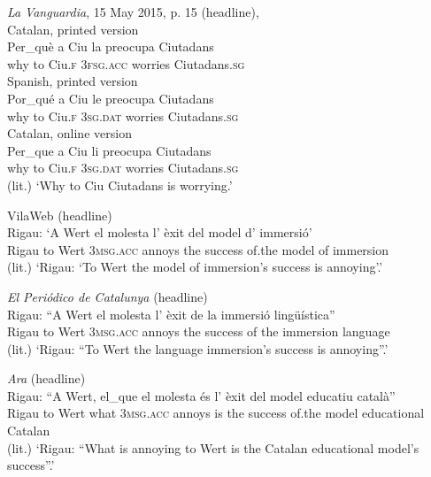 \documentclass[output=paper,colorlinks,citecolor=brown,modfonts,nonflat]{langsci/langscibook}
\begin{document}
\ea%
 \emph{La} \emph{Vanguardia}, 15 May 2015, p. 15 (headline),
 \label{ex:royo:5}\\
 \ea Catalan, printed version \label{ex:royo:5a}\\
 \gll Per\_què a Ciu la preocupa Ciutadans \\
why      to Ciu.\textsc{f} 3\textsc{fsg.acc} worries   Ciutadans.\textsc{sg} \\


 \ex Spanish, printed version \label{ex:royo:5b}\\
 \gll Por\_qué a Ciu le preocupa Ciutadans\\
why      to Ciu.\textsc{f} \textsc{3sg.dat} worries    Ciutadans.\textsc{sg}\\


\ex Catalan, online version \label{ex:royo:5c}\\
 \gll Per\_que a Ciu li preocupa Ciutadans \\
	why      to Ciu.\textsc{f} 3\textsc{sg.dat} worries    Ciutadans.\textsc{sg}\\
 \glt (lit.) ‘Why to Ciu Ciutadans is worrying.’

 \z
 \z


\ea%
 \label{ex:royo:6}
 \ea VilaWeb (headline)\\
 \gll Rigau: ‘A Wert el molesta l’ èxit del model d’ immersió’\\
Rigau   to Wert \textsc{3msg.acc} annoys   the success of.the model of immersion\\
 \glt (lit.) ‘Rigau: ‘To Wert the model of immersion’s success is annoying’.’

 \ex \textit{El Periódico de Catalunya} (headline)\\
 \gll Rigau: “A Wert el molesta l’ èxit de la immersió lingüística”\\
 Rigau   to Wert 3\textsc{msg.acc} annoys  the success of the immersion language\\
 \glt (lit.) ‘Rigau: “To Wert the language immersion’s success is annoying”.’

 \ex \textit{Ara} (headline)\\
 \gll Rigau: “A Wert, el\_que el molesta és l’ èxit del model educatiu català”\\
Rigau    to Wert what   \textsc{3msg.acc} annoys  is the success of.the model educational Catalan\\
 \glt (lit.) ‘Rigau: “What is annoying to Wert is the Catalan educational model’s success”.’
 \z
 \z
{}
\end{document}
